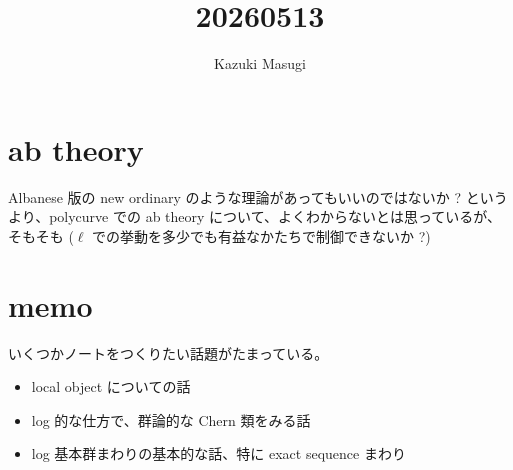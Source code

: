 \documentclass[dvipdfmx]{article}
\title{20260513}
\author{Kazuki Masugi}
\date{}
\theoremstyle{definition}
\begin{document}
\maketitle

\section{ab theory}

Albanese 版の new ordinary のような理論があってもいいのではないか ? というより、polycurve での ab theory について、よくわからないとは思っているが、そもそも ($\ell$ での挙動を多少でも有益なかたちで制御できないか ?)

\section{memo}

いくつかノートをつくりたい話題がたまっている。

\begin{itemize}
	\item local object についての話
	\item log 的な仕方で、群論的な Chern 類をみる話
	\item log 基本群まわりの基本的な話、特に exact sequence まわり
\end{itemize}
\end{document}
